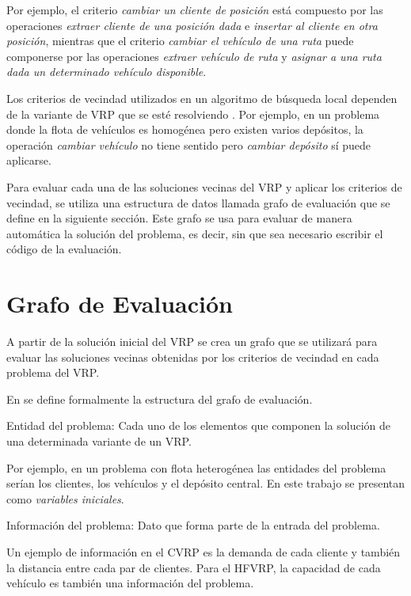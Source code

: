 Por ejemplo, el criterio \textit{cambiar un cliente de posición} está compuesto por las operaciones \textit{extraer cliente de una posición dada} e \textit{insertar al cliente en otra posición},
mientras que el criterio \textit{cambiar el vehículo de una ruta} puede componerse por las operaciones \textit{ extraer vehículo de ruta} y \textit{ asignar a una ruta dada un determinado vehículo disponible}.

Los criterios de vecindad utilizados en un algoritmo de búsqueda local dependen de la variante de VRP que se esté resolviendo \cite{Daniela}. Por ejemplo, en un problema donde la flota de vehículos es homogénea pero existen varios depósitos, la operación \textit{cambiar vehículo} no tiene sentido pero \textit{cambiar depósito} sí puede aplicarse.

Para evaluar cada una de las soluciones vecinas del VRP y aplicar los criterios de vecindad, se utiliza una estructura de datos llamada grafo de evaluación que se define en la siguiente sección. Este grafo se usa para evaluar de manera automática la solución del problema, es decir, sin que sea necesario escribir el código de la evaluación.

\section{Grafo de Evaluación}\label{3-EvalGraph}

A partir de la solución inicial del VRP se crea un grafo que se utilizará para evaluar las soluciones vecinas obtenidas por los criterios de vecindad en cada problema del VRP.

En \cite{JJ} se define formalmente la estructura del grafo de evaluación.

\begin{defn}
	Entidad del problema: Cada uno de los elementos que componen la solución de una determinada variante de un VRP.
\end{defn}
  
  Por ejemplo, en un problema con flota heterogénea las entidades del problema serían los clientes, los vehículos y el depósito central. En este trabajo se presentan como \textit{variables iniciales}.
  
  \begin{defn}
	  Información del problema: Dato que forma parte de la entrada del problema.
  \end{defn}
  
  Un ejemplo de información en el CVRP es la demanda de cada cliente y también la distancia entre cada par de clientes. Para el HFVRP, la capacidad
  de cada vehículo es también una información del problema.
  
